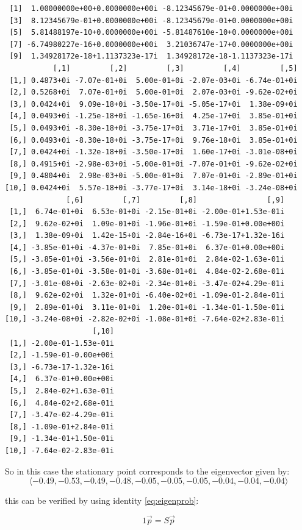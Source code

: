 \documentclass[11pt]{article}
\begin{document}
\begin{verbatim}
 [1]  1.00000000e+00+0.0000000e+00i -8.12345679e-01+0.0000000e+00i
 [3]  8.12345679e-01+0.0000000e+00i -8.12345679e-01+0.0000000e+00i
 [5]  5.81488197e-10+0.0000000e+00i -5.81487610e-10+0.0000000e+00i
 [7] -6.74980227e-16+0.0000000e+00i  3.21036747e-17+0.0000000e+00i
 [9]  1.34928172e-18+1.1137323e-17i  1.34928172e-18-1.1137323e-17i
           [,1]         [,2]         [,3]         [,4]         [,5]
 [1,] 0.4873+0i -7.07e-01+0i  5.00e-01+0i -2.07e-03+0i -6.74e-01+0i
 [2,] 0.5268+0i  7.07e-01+0i  5.00e-01+0i  2.07e-03+0i -9.62e-02+0i
 [3,] 0.0424+0i  9.09e-18+0i -3.50e-17+0i -5.05e-17+0i  1.38e-09+0i
 [4,] 0.0493+0i -1.25e-18+0i -1.65e-16+0i  4.25e-17+0i  3.85e-01+0i
 [5,] 0.0493+0i -8.30e-18+0i -3.75e-17+0i  3.71e-17+0i  3.85e-01+0i
 [6,] 0.0493+0i -8.30e-18+0i -3.75e-17+0i  9.76e-18+0i  3.85e-01+0i
 [7,] 0.0424+0i -1.32e-18+0i -3.50e-17+0i  1.60e-17+0i -3.01e-08+0i
 [8,] 0.4915+0i -2.98e-03+0i -5.00e-01+0i -7.07e-01+0i -9.62e-02+0i
 [9,] 0.4804+0i  2.98e-03+0i -5.00e-01+0i  7.07e-01+0i -2.89e-01+0i
[10,] 0.0424+0i  5.57e-18+0i -3.77e-17+0i  3.14e-18+0i -3.24e-08+0i
              [,6]         [,7]         [,8]                [,9]
 [1,]  6.74e-01+0i  6.53e-01+0i -2.15e-01+0i -2.00e-01+1.53e-01i
 [2,]  9.62e-02+0i  1.09e-01+0i -1.96e-01+0i -1.59e-01+0.00e+00i
 [3,]  1.38e-09+0i  1.42e-15+0i -2.84e-16+0i -6.73e-17+1.32e-16i
 [4,] -3.85e-01+0i -4.37e-01+0i  7.85e-01+0i  6.37e-01+0.00e+00i
 [5,] -3.85e-01+0i -3.56e-01+0i  2.81e-01+0i  2.84e-02-1.63e-01i
 [6,] -3.85e-01+0i -3.58e-01+0i -3.68e-01+0i  4.84e-02-2.68e-01i
 [7,] -3.01e-08+0i -2.63e-02+0i -2.34e-01+0i -3.47e-02+4.29e-01i
 [8,]  9.62e-02+0i  1.32e-01+0i -6.40e-02+0i -1.09e-01-2.84e-01i
 [9,]  2.89e-01+0i  3.11e-01+0i  1.20e-01+0i -1.34e-01-1.50e-01i
[10,] -3.24e-08+0i -2.82e-02+0i -1.08e-01+0i -7.64e-02+2.83e-01i
                    [,10]
 [1,] -2.00e-01-1.53e-01i
 [2,] -1.59e-01-0.00e+00i
 [3,] -6.73e-17-1.32e-16i
 [4,]  6.37e-01+0.00e+00i
 [5,]  2.84e-02+1.63e-01i
 [6,]  4.84e-02+2.68e-01i
 [7,] -3.47e-02-4.29e-01i
 [8,] -1.09e-01+2.84e-01i
 [9,] -1.34e-01+1.50e-01i
[10,] -7.64e-02-2.83e-01i
\end{verbatim}


So in this case the stationary point corresponds to the eigenvector given by:
\[
\langle -0.49, -0.53, -0.49, -0.48, -0.05, -0.05, -0.05, -0.04, -0.04, -0.04 \rangle
\]

this can be verified by using identity \eqref{eq:eigenprob}:

$$
1 \vec{p} = S\vec{p}
$$
\end{document}
